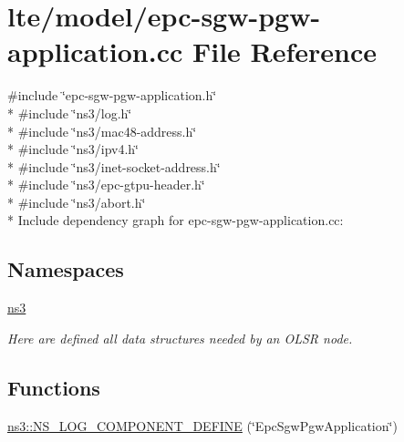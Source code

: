 \hypertarget{epc-sgw-pgw-application_8cc}{}\section{lte/model/epc-\/sgw-\/pgw-\/application.cc File Reference}
\label{epc-sgw-pgw-application_8cc}
{\ttfamily \#include \char`\"{}epc-\/sgw-\/pgw-\/application.\+h\char`\"{}}\\*
{\ttfamily \#include \char`\"{}ns3/log.\+h\char`\"{}}\\*
{\ttfamily \#include \char`\"{}ns3/mac48-\/address.\+h\char`\"{}}\\*
{\ttfamily \#include \char`\"{}ns3/ipv4.\+h\char`\"{}}\\*
{\ttfamily \#include \char`\"{}ns3/inet-\/socket-\/address.\+h\char`\"{}}\\*
{\ttfamily \#include \char`\"{}ns3/epc-\/gtpu-\/header.\+h\char`\"{}}\\*
{\ttfamily \#include \char`\"{}ns3/abort.\+h\char`\"{}}\\*
Include dependency graph for epc-\/sgw-\/pgw-\/application.cc\+:
\subsection*{Namespaces}
\begin{DoxyCompactItemize}
\item 
 \hyperlink{namespacens3}{ns3}
\begin{DoxyCompactList}\small\item\em Here are defined all data structures needed by an O\+L\+SR node. \end{DoxyCompactList}\end{DoxyCompactItemize}
\subsection*{Functions}
\begin{DoxyCompactItemize}
\item 
\hyperlink{namespacens3_a1df990833e235197255feea3a6e1d022}{ns3\+::\+N\+S\+\_\+\+L\+O\+G\+\_\+\+C\+O\+M\+P\+O\+N\+E\+N\+T\+\_\+\+D\+E\+F\+I\+NE} (\char`\"{}Epc\+Sgw\+Pgw\+Application\char`\"{})
\end{DoxyCompactItemize}

